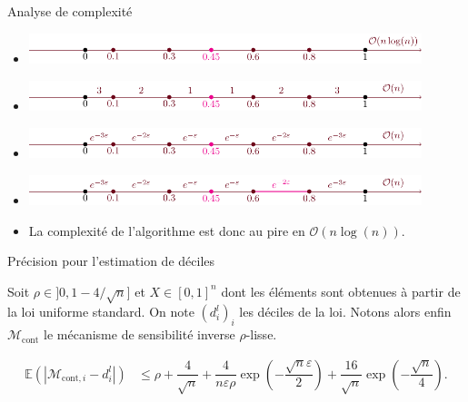 \documentclass[10pt,serif]{beamer}
\begin{document}
  \begin{frame}{Analyse de complexité}
    \begin{center}
      \begin{itemize}
        \item<1->{\includegraphics[width=0.90\textwidth, clip]{"./presentation/figures/step1.pdf"}}\vspace{0.8cm}
        \item<2->{\includegraphics[width=0.90\textwidth, clip]{"./presentation/figures/step2.pdf"}}\vspace{0.8cm}
        \item<3->{\includegraphics[width=0.90\textwidth, clip]{"./presentation/figures/step3.pdf"}}\vspace{0.8cm}
        \item<4->{\includegraphics[width=0.90\textwidth, clip]{"./presentation/figures/step4.pdf"}}
        \item<5> La complexité de l'algorithme est donc au pire en \(\mathcal O(n\log(n))\).
      \end{itemize}
    \end{center}
  \end{frame}

  \begin{frame}{Précision pour l'estimation de déciles}
      \begin{theorem}
        Soit \(\rho \in ]0, 1 - 4/\sqrt n]\) et \(X \in [0,1]^n\) dont les éléments sont obtenues à partir de la loi uniforme standard. On note \((d_i^l)_i\) les déciles de la loi. Notons alors enfin \(\mathcal M_{\text{cont}}\) le mécanisme de sensibilité inverse \(\rho\)-lisse.
    
        \begin{align*}
            \mathbb E(|\mathcal M_{\text{cont}, i} - d_i^l|) & \leq \rho + \dfrac{4}{\sqrt n} +\dfrac{4}{n\varepsilon\rho}\exp\left( -\dfrac{\sqrt n \varepsilon}{2} \right) + \dfrac{16}{\sqrt{n}}\exp\left( -\dfrac{\sqrt n }{4} \right).
        \end{align*}
      \end{theorem}
  \end{frame}
\end{document}
